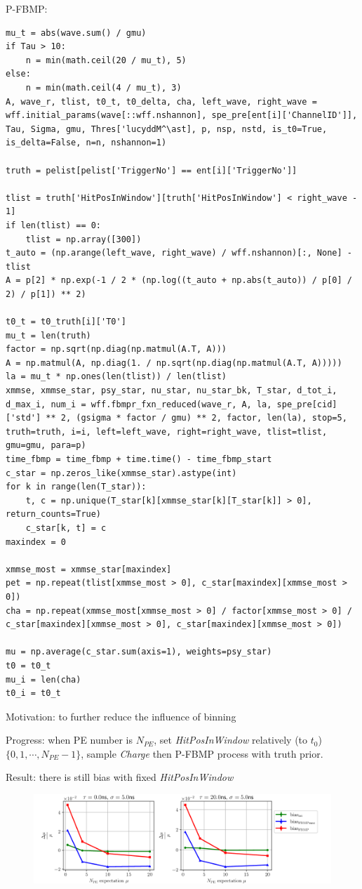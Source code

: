 \documentclass[notitlepage]{article}
\begin{document}
P-FBMP:

\begin{lstlisting}
mu_t = abs(wave.sum() / gmu)
if Tau > 10:
    n = min(math.ceil(20 / mu_t), 5)
else:
    n = min(math.ceil(4 / mu_t), 3)
A, wave_r, tlist, t0_t, t0_delta, cha, left_wave, right_wave = wff.initial_params(wave[::wff.nshannon], spe_pre[ent[i]['ChannelID']], Tau, Sigma, gmu, Thres['lucyddM^\ast], p, nsp, nstd, is_t0=True, is_delta=False, n=n, nshannon=1)

truth = pelist[pelist['TriggerNo'] == ent[i]['TriggerNo']]

tlist = truth['HitPosInWindow'][truth['HitPosInWindow'] < right_wave - 1]
if len(tlist) == 0:
    tlist = np.array([300])
t_auto = (np.arange(left_wave, right_wave) / wff.nshannon)[:, None] - tlist
A = p[2] * np.exp(-1 / 2 * (np.log((t_auto + np.abs(t_auto)) / p[0] / 2) / p[1]) ** 2)

t0_t = t0_truth[i]['T0']
mu_t = len(truth)
factor = np.sqrt(np.diag(np.matmul(A.T, A)))
A = np.matmul(A, np.diag(1. / np.sqrt(np.diag(np.matmul(A.T, A)))))
la = mu_t * np.ones(len(tlist)) / len(tlist)
xmmse, xmmse_star, psy_star, nu_star, nu_star_bk, T_star, d_tot_i, d_max_i, num_i = wff.fbmpr_fxn_reduced(wave_r, A, la, spe_pre[cid]['std'] ** 2, (gsigma * factor / gmu) ** 2, factor, len(la), stop=5, truth=truth, i=i, left=left_wave, right=right_wave, tlist=tlist, gmu=gmu, para=p)
time_fbmp = time_fbmp + time.time() - time_fbmp_start
c_star = np.zeros_like(xmmse_star).astype(int)
for k in range(len(T_star)):
    t, c = np.unique(T_star[k][xmmse_star[k][T_star[k]] > 0], return_counts=True)
    c_star[k, t] = c
maxindex = 0

xmmse_most = xmmse_star[maxindex]
pet = np.repeat(tlist[xmmse_most > 0], c_star[maxindex][xmmse_most > 0])
cha = np.repeat(xmmse_most[xmmse_most > 0] / factor[xmmse_most > 0] / c_star[maxindex][xmmse_most > 0], c_star[maxindex][xmmse_most > 0])

mu = np.average(c_star.sum(axis=1), weights=psy_star)
t0 = t0_t
mu_i = len(cha)
t0_i = t0_t
\end{lstlisting}

Motivation: to further reduce the influence of binning

Progress: when PE number is $N_{PE}$, set \textit{HitPosInWindow} relatively (to $t_0$) $\{0,1,\cdots,N_{PE}-1\}$, sample \textit{Charge} then P-FBMP process with truth prior. 

Result: there is still bias with fixed \textit{HitPosInWindow}

\begin{figure}[H]
    \centering
    \includegraphics[width=\textwidth]{vs-biasmu-fixtlist.png}
\end{figure}
\end{document}
